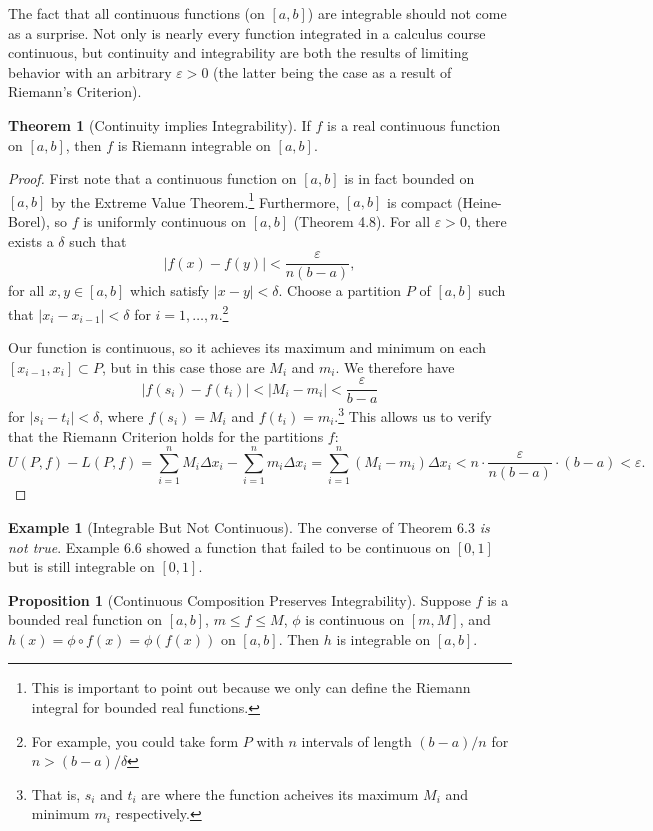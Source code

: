 \documentclass{article}
\theoremstyle{definition}
\newtheorem{proposition}{Proposition}[section]
\newtheorem{theorem}{Theorem}[section]
\newtheorem{example}{Example}[section]
\begin{document}
	The fact that all continuous functions (on $ [a,b] $) are integrable should not come as a surprise. Not only is nearly every function integrated in a calculus course continuous, but continuity and integrability are both the results of limiting behavior with an arbitrary $ \varepsilon>0 $ (the latter being the case as a result of Riemann's Criterion). 
	\begin{theorem}[Continuity implies Integrability]
		If $ f $ is a real continuous function on $ [a,b] $, then $ f $ is Riemann integrable on $ [a,b] $.
	\end{theorem}
	\begin{proof}
		First note that a continuous function on $ [a,b] $ is in fact bounded on $ [a,b] $ by the Extreme Value Theorem.\footnote{This is important to point out because we only can define the Riemann integral for bounded real functions.} Furthermore, $ [a,b] $ is compact (Heine-Borel), so $ f $ is uniformly continuous on $ [a,b] $ (Theorem 4.8). For all $ \varepsilon>0 $, there exists a $ \delta $ such that $$|f(x)-f(y)|<\frac{\varepsilon}{n(b-a)} ,$$ for all $ x,y\in[a,b] $ which satisfy $ |x-y|<\delta $. Choose a partition  $ P $ of $ [a,b] $ such that $|x_i-x_{i-1}|<\delta $ for $ i=1,\ldots, n$.\footnote{For example, you could take form $ P $ with $ n $ intervals of length $ (b-a)/n $ for $ n>(b-a)/\delta $} 
		
		Our function is continuous, so it achieves its maximum and minimum on each $ [x_{i-1},x_{i}]\subset P $, but in this case those are $ M_i $ and $ m_i $. We therefore have $$|f(s_i)-f(t_i)|<|M_i-m_i|<\frac{\varepsilon}{b-a} $$ for $ |s_i-t_i|<\delta $, where $ f(s_i)=M_i $ and $ f(t_i)=m_i $.\footnote{That is, $ s_i $ and $ t_i $ are where the function acheives its maximum $ M_i $ and minimum $ m_i $ respectively.} This allows us to verify that the Riemann Criterion holds for the partitions $ f $: $$ U(P,f)-L(P,f)=\sum_{i=1}^nM_i\Delta x_i-\sum_{i=1}^nm_i\Delta x_i=\sum_{i=1}^n(M_i-m_i)\Delta x_i<n\cdot\frac{\varepsilon}{n(b-a)}\cdot(b-a)<\varepsilon.$$
	\end{proof}
	\begin{example}[Integrable But Not Continuous]
		The converse of Theorem 6.3 \textit{is not true}. Example 6.6 showed a function that failed to be continuous on $ [0,1] $ but is still integrable on $ [0,1] $. 
	\end{example}
	\begin{proposition}[Continuous Composition Preserves Integrability]
		Suppose $ f $ is a bounded real function on $ [a,b] $, $ m\le f\le M $, $ \phi $ is continuous on $ [m,M] $, and $ h(x)=\phi\circ f(x)=\phi(f(x)) $ on $ [a,b] $. Then $ h $ is integrable on $ [a,b] $.
	\end{proposition}
\end{document}
